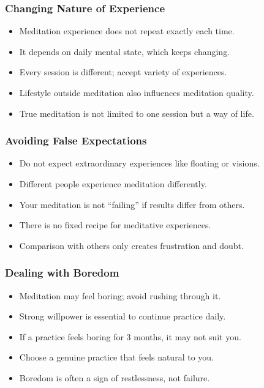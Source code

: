 \begin{frame}[fragile]\frametitle{Changing Nature of Experience}
      \begin{itemize}
        \item Meditation experience does not repeat exactly each time.
        \item It depends on daily mental state, which keeps changing.
        \item Every session is different; accept variety of experiences.
        \item Lifestyle outside meditation also influences meditation quality.
        \item True meditation is not limited to one session but a way of life.
      \end{itemize}
\end{frame}

\begin{frame}[fragile]\frametitle{Avoiding False Expectations}
      \begin{itemize}
        \item Do not expect extraordinary experiences like floating or visions.
        \item Different people experience meditation differently.
        \item Your meditation is not “failing” if results differ from others.
        \item There is no fixed recipe for meditative experiences.
        \item Comparison with others only creates frustration and doubt.
      \end{itemize}
\end{frame}

\begin{frame}[fragile]\frametitle{Dealing with Boredom}
      \begin{itemize}
        \item Meditation may feel boring; avoid rushing through it.
        \item Strong willpower is essential to continue practice daily.
        \item If a practice feels boring for 3 months, it may not suit you.
        \item Choose a genuine practice that feels natural to you.
        \item Boredom is often a sign of restlessness, not failure.
      \end{itemize}
\end{frame}

